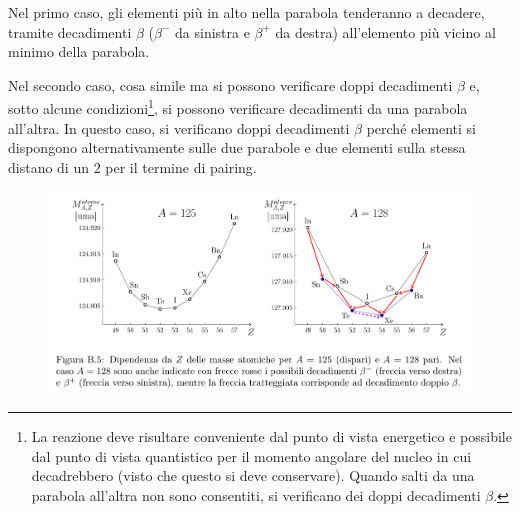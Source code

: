 \documentclass[10pt, a4paper]{scrartcl}
\numberwithin{equation}{subsection}
\theoremstyle{style1}
\begin{document}
Nel primo caso, gli elementi pi\`u in alto nella parabola tenderanno a decadere, tramite decadimenti $\beta $ ($\beta ^-$ da sinistra e $\beta ^+$ da destra) all'elemento pi\`u vicino al minimo della parabola.

Nel secondo caso, cosa simile ma si possono verificare doppi decadimenti $\beta $ e, sotto alcune condizioni\footnote{La reazione deve risultare conveniente dal punto di vista energetico e possibile dal punto di vista quantistico per il momento angolare del nucleo in cui decadrebbero (visto che questo si deve conservare). Quando salti da una parabola all'altra non sono consentiti, si verificano dei doppi decadimenti $\beta $.}, si possono verificare decadimenti da una parabola all'altra. In questo caso, si verificano doppi decadimenti $\beta $ perch\'e elementi si dispongono alternativamente sulle due parabole e due elementi sulla stessa distano di un $2$ per il termine di pairing.
\begin{figure}[h!]
	\centering
	\includegraphics[width=1\columnwidth]{betpair.png}
\end{figure}
\end{document}
